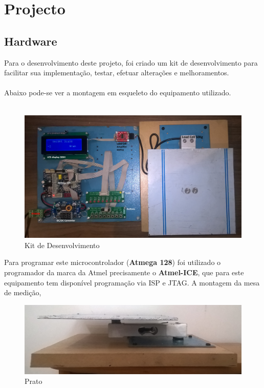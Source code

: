 \chapter{Projecto}
\section{Hardware}
Para o desenvolvimento deste projeto, foi criado um kit de desenvolvimento para facilitar sua implementação, testar, efetuar alterações e melhoramentos.\\
\\
Abaixo pode-se ver a montagem em esqueleto do equipamento utilizado.
\newline
\\
\\
\begin{figure}[H]
	\centering
	\includegraphics[scale=0.15]{./image/PESTA/kit/Kit_Desenvolvimento_2.jpg}
	\caption{Kit de Desenvolvimento}
	\label{Kit_Desenvolvimento_2}
\end{figure}
Para programar este microcontrolador (\textbf{Atmega 128}) foi utilizado o programador da marca da Atmel precisamente o \textbf{Atmel-ICE}, que para este equipamento tem disponível programação via ISP e JTAG.
\newpage
A montagem da mesa de medição,
\begin{figure}[H]
	\centering
	\includegraphics[scale=0.15]{./image/PESTA/material/Prato.jpg}
	\caption{Prato}
	\label{Prato}
\end{figure}
